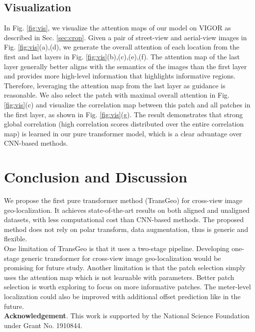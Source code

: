 \documentclass[10pt,twocolumn,letterpaper]{article}
\begin{document}
\subsection{Visualization}
\label{sec:vis}
In Fig. \ref{fig:vis}, we visualize the attention maps of our model on VIGOR as described in Sec. \ref{sec:crop}. Given a pair of street-view and aerial-view images in Fig. \ref{fig:vis}(a),(d), we generate the overall attention of each location from the first and last layers in Fig. \ref{fig:vis}(b),(c),(e),(f). The attention map of the last layer generally better aligns with the semantics of the images than the first layer and provides more high-level information that highlights informative regions. Therefore, leveraging the attention map from the last layer as guidance is reasonable. We also select the patch with maximal overall attention in Fig. \ref{fig:vis}(c) and visualize the correlation map between this patch and all patches in the first layer, as shown in Fig. \ref{fig:vis}(g). The result demonstrates that strong global correlation (\ie high correlation scores distributed over the entire correlation map) is learned in our pure transformer model, which is a clear advantage over CNN-based methods. 


\section{Conclusion and Discussion}
We propose the first pure transformer method (TransGeo) for cross-view image geo-localization. It achieves state-of-the-art results on both aligned and unaligned datasets, with less computational cost than CNN-based methods. The proposed method does not rely on polar transform, data augmentation, thus is generic and flexible.\\
\indent One limitation of TransGeo is that it uses a two-stage pipeline. Developing one-stage generic transformer for cross-view image geo-localization would be promising for future study. Another limitation is that the patch selection simply uses the attention map which is not learnable with parameters. Better patch selection is worth exploring to focus on more informative patches. The meter-level localization could also be improved with additional offset prediction like \cite{zhu2021vigor} in the future. \\
\small{\textbf{Acknowledgement}. This work is supported by the National Science Foundation under Grant No. 1910844.}

{\small


}
\end{document}
